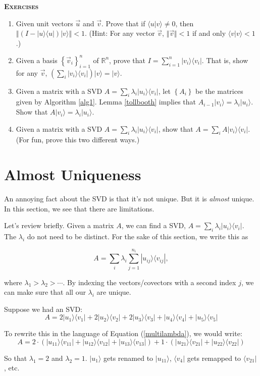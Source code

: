 \documentclass{amsbook}
\begin{document}
{\bfseries\scshape\Large Exercises}

\begin{enumerate}
\item \label{finish_projection} Given unit vectors $\vec u$ and $\vec v$.  Prove that if $\langle u|v\rangle\neq0$, then $\left\Vert\left(I-|u\rangle\langle u|\right)|v\rangle\right\Vert < 1$.  (Hint:  For any vector $\vec v $, $\Vert \vec v \Vert<1$ if and only $\langle  v | v \rangle<1$.)
\item \label{outer_product_identity} Given a basis $\left\{\vec v_i\right\}_{i=1}^n$ of $\mathbb R^n$, prove that $I=\sum_{i=1}^n|v_i\rangle\langle v_i|$.  That is, show for any $\vec v$, $\left(\sum_i|v_i\rangle\langle v_i|\right)|v\rangle=|v\rangle$.
\item Given a matrix with a SVD $A=\sum_i\lambda_i|u_i\rangle\langle v_i|$, let $\left\{A_i\right\}$ be the matrices given by Algorithm \ref{alg1}.  Lemma \ref{tollbooth} implies that $A_{i-1}|v_i\rangle=\lambda_i|u_i\rangle$.  Show that $A|v_i\rangle=\lambda_i|u_i\rangle$.
\item Given a matrix with a SVD $A=\sum_i\lambda_i|u_i\rangle\langle v_i|$, show that $A=\sum_iA|v_i\rangle\langle v_i|$.  (For fun, prove this two different ways.)
\end{enumerate}

\section{Almost Uniqueness}\label{almost_uniqueness}

An annoying fact about the SVD is that it's not unique.  But it is {\em almost} unique.  In this section, we see that there are limitations.

Let's review briefly.  Given a matrix $A$, we can find a SVD, $A=\sum_i\lambda_i|u_i\rangle\langle v_i|$.  The $\lambda_i$ do not need to be distinct.  For the sake of this section, we write this as 

\begin{equation}
\label{multilambda}
A=\sum_i\lambda_i\sum_{j=1}^{n_i}|u_{ij}\rangle\langle v_{ij}|,
\end{equation}

 where $\lambda_1>\lambda_2>\cdots$.  By indexing the vectors/covectors with a second index $j$, we can make sure that all our $\lambda_i$ are unique.
 
\begin{tcolorbox}[title=Example,colback=blue!5]
Suppose we had an SVD:
$$
A=2|u_1\rangle\langle v_1|+2|u_2\rangle\langle v_2|+2|u_3\rangle\langle v_3|+|u_4\rangle\langle v_4|+|u_5\rangle\langle v_5|
$$

To rewrite this in the language of Equation (\ref{multilambda}), we would write:
$$
A=2\cdot\left(|u_{11}\rangle\langle v_{11}|+|u_{12}\rangle\langle v_{12}|+|u_{13}\rangle\langle v_{13}|\right)+1\cdot\left(|u_{21}\rangle\langle v_{21}|+|u_{22}\rangle\langle v_{22}|\right)
$$

So that $\lambda_1=2$ and $\lambda_2=1$.  $|u_1\rangle$ gets renamed to $|u_{11}\rangle$, $\langle v_4|$ gets remapped to $\langle v_{21}|$, etc.

\end{tcolorbox}
\end{document}
